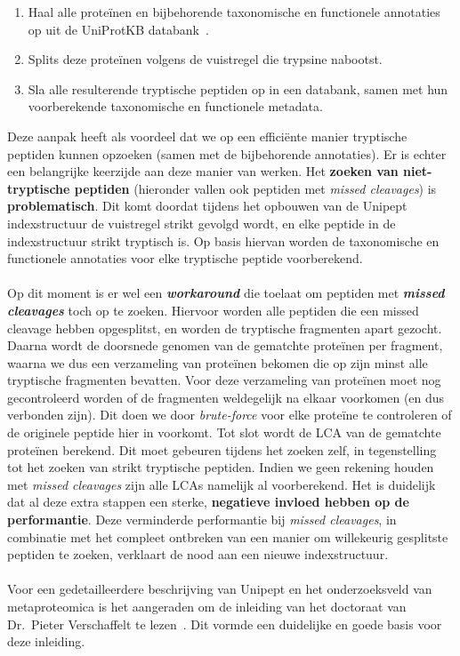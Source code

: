 \begin{enumerate}
    \item Haal alle proteïnen en bijbehorende taxonomische en functionele annotaties op uit de UniProtKB databank~\cite{UniprotKB}.
    \item Splits deze proteïnen volgens de vuistregel die trypsine nabootst.
    \item Sla alle resulterende tryptische peptiden op in een databank, samen met hun voorberekende taxonomische en functionele metadata.
\end{enumerate}

Deze aanpak heeft als voordeel dat we op een efficiënte manier tryptische peptiden kunnen opzoeken (samen met de bijbehorende annotaties).
Er is echter een belangrijke keerzijde aan deze manier van werken.
Het \textbf{zoeken van niet-tryptische peptiden} (hieronder vallen ook peptiden met \textit{missed cleavages}) is \textbf{problematisch}.
Dit komt doordat tijdens het opbouwen van de Unipept indexstructuur de vuistregel strikt gevolgd wordt, en elke peptide in de indexstructuur strikt tryptisch is.
Op basis hiervan worden de taxonomische en functionele annotaties voor elke tryptische peptide voorberekend.
\\ \\
Op dit moment is er wel een \textbf{\textit{workaround}} die toelaat om peptiden met \textbf{\textit{missed cleavages}} toch op te zoeken.
Hiervoor worden alle peptiden die een missed cleavage hebben opgesplitst, en worden de tryptische fragmenten apart gezocht.
Daarna wordt de doorsnede genomen van de gematchte proteïnen per fragment, waarna we dus een verzameling van proteïnen bekomen die op zijn minst alle tryptische fragmenten bevatten.
Voor deze verzameling van proteïnen moet nog gecontroleerd worden of de fragmenten weldegelijk na elkaar voorkomen (en dus verbonden zijn).
Dit doen we door \textit{brute-force} voor elke proteïne te controleren of de originele peptide hier in voorkomt.
Tot slot wordt de LCA van de gematchte proteïnen berekend.
Dit moet gebeuren tijdens het zoeken zelf, in tegenstelling tot het zoeken van strikt tryptische peptiden.
Indien we geen rekening houden met \textit{missed cleavages} zijn alle LCAs namelijk al voorberekend.
Het is duidelijk dat al deze extra stappen een sterke, \textbf{negatieve invloed hebben op de performantie}.
Deze verminderde performantie bij \textit{missed cleavages}, in combinatie met het compleet ontbreken van een manier om willekeurig gesplitste peptiden te zoeken, verklaart de nood aan een nieuwe indexstructuur.
\\ \\
Voor een gedetailleerdere beschrijving van Unipept en het onderzoeksveld van metaproteomica is het aangeraden om de inleiding van het doctoraat van Dr.~Pieter Verschaffelt te lezen~\cite{phdPieterUnipept}.
Dit vormde een duidelijke en goede basis voor deze inleiding.


